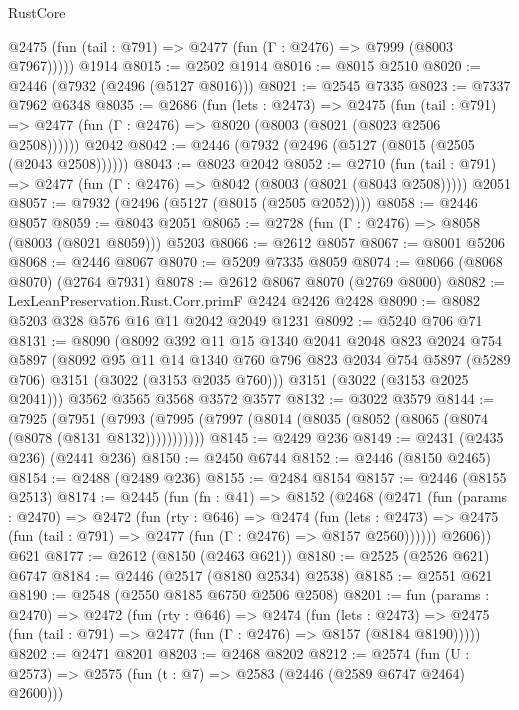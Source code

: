 \begin{lexlean}{RustCore}
\begin{coremodule}
      @2475 (fun (tail : @791) => @2477 (fun (Γ : @2476) => @7999 (@8003 @7967)))))
    @1914
@8015 := @2502 @1914
@8016 := @8015 @2510
@8020 := @2446 (@7932 (@2496 (@5127 @8016)))
@8021 := @2545 @7335
@8023 := @7337 @7962 @6348
@8035 := @2686
    (fun (lets : @2473) =>
    @2475
      (fun (tail : @791) => @2477 (fun (Γ : @2476) => @8020 (@8003 (@8021 (@8023 @2506 @2508))))))
    @2042
@8042 := @2446 (@7932 (@2496 (@5127 (@8015 (@2505 (@2043 @2508))))))
@8043 := @8023 @2042
@8052 := @2710
    (fun (tail : @791) => @2477 (fun (Γ : @2476) => @8042 (@8003 (@8021 (@8043 @2508)))))
    @2051
@8057 := @7932 (@2496 (@5127 (@8015 (@2505 @2052))))
@8058 := @2446 @8057
@8059 := @8043 @2051
@8065 := @2728 (fun (Γ : @2476) => @8058 (@8003 (@8021 @8059))) @5203
@8066 := @2612 @8057
@8067 := @8001 @5206
@8068 := @2446 @8067
@8070 := @5209 @7335 @8059
@8074 := @8066 (@8068 @8070) (@2764 @7931)
@8078 := @2612 @8067 @8070 (@2769 @8000)
@8082 := LexLeanPreservation.Rust.Corr.primF @2424 @2426 @2428
@8090 := @8082 @5203 @328 @576 @16 @11 @2042 @2049 @1231
@8092 := @5240 @706 @71
@8131 := @8090
    (@8092
      @392
      @11
      @15
      @1340
      @2041
      @2048
      @823
      @2024
      @754
      @5897
      (@8092
        @95
        @11
        @14
        @1340
        @760
        @796
        @823
        @2034
        @754
        @5897
        (@5289 @706)
        @3151
        (@3022 (@3153 @2035 @760)))
      @3151
      (@3022 (@3153 @2025 @2041)))
    @3562
    @3565
    @3568
    @3572
    @3577
@8132 := @3022 @3579
@8144 := @7925
    (@7951 (@7993 (@7995 (@7997 (@8014 (@8035 (@8052 (@8065 (@8074 (@8078 (@8131 @8132)))))))))))
@8145 := @2429 @236
@8149 := @2431 (@2435 @236) (@2441 @236)
@8150 := @2450 @6744
@8152 := @2446 (@8150 @2465)
@8154 := @2488 (@2489 @236)
@8155 := @2484 @8154
@8157 := @2446 (@8155 @2513)
@8174 := @2445
    (fun (fn : @41) =>
    @8152
      (@2468
        (@2471
          (fun (params : @2470) =>
          @2472
            (fun (rty : @646) =>
            @2474
              (fun (lets : @2473) =>
              @2475 (fun (tail : @791) => @2477 (fun (Γ : @2476) => @8157 @2560))))))
        @2606))
    @621
@8177 := @2612 (@8150 (@2463 @621))
@8180 := @2525 (@2526 @621) @6747
@8184 := @2446 (@2517 (@8180 @2534) @2538)
@8185 := @2551 @621
@8190 := @2548 (@2550 @8185 @6750 @2506 @2508)
@8201 := fun (params : @2470) =>
  @2472
    (fun (rty : @646) =>
    @2474
      (fun (lets : @2473) =>
      @2475 (fun (tail : @791) => @2477 (fun (Γ : @2476) => @8157 (@8184 @8190)))))
@8202 := @2471 @8201
@8203 := @2468 @8202
@8212 := @2574 (fun (U : @2573) => @2575 (fun (t : @7) => @2583 (@2446 (@2589 @6747 @2464) @2600)))

\end{coremodule}
\end{lexlean}
